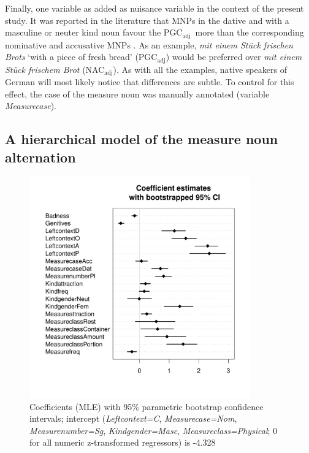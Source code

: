 \documentclass[USenglish]{article}
\newcommand{\Sub}[1]{\ensuremath{\mathrm{_{#1}}}}
\newcommand{\NACa}{NAC\Sub{adj}}
\newcommand{\PGCa}{PGC\Sub{adj}}
\begin{document}
Finally, one variable as added as nuisance variable in the context of the present study.
It was reported in the literature that MNPs in the dative and with a masculine or neuter kind noun favour the \PGCa\ more than the corresponding nominative and accusative MNPs \citep{Hentschel1993,Zimmer2015}.
As an example, \textit{mit einem Stück frischen Brots} `with a piece of fresh bread' (\PGCa) would be preferred over \textit{mit einem Stück frischem Brot} (\NACa).
As with all the examples, native speakers of German will most likely notice that differences are subtle.
To control for this effect, the case of the measure noun was manually annotated (variable \textit{Measurecase}).




\subsection{A hierarchical model of the measure noun alternation}
\label{sec:corpushierarchicalmodel}

\begin{figure}[hb!]
  \centering
  \includegraphics[width=0.85\textwidth]{../R/output/corpus_fixeffs}
  \caption{Coefficients (MLE) with 95\% parametric bootstrap confidence intervals; intercept (\textit{Leftcontext=C}, \textit{Measurecase=Nom}, \textit{Measurenumber=Sg}, \textit{Kindgender=Masc}, \textit{Measureclass=Physical}; 0 for all numeric z-transformed regressors) is -4.328}
  \label{fig:fixeffs}
\end{figure}
\end{document}
